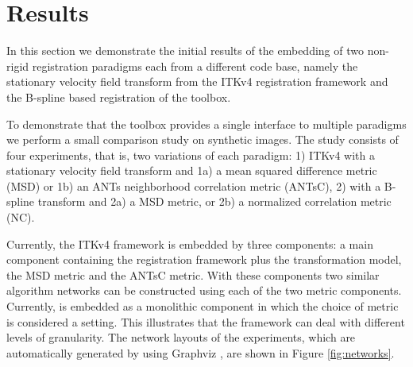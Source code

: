 \section{Results}
\label{sec:results}

In this section we demonstrate the initial results of the embedding
of two non-rigid registration paradigms each from a different code
base, namely the stationary velocity field transform from the ITKv4
registration framework and the B-spline based registration of the
\elastix{} toolbox.

To demonstrate that the toolbox provides a single interface to 
multiple paradigms we perform a small comparison study on synthetic 
images. The study consists of four experiments, that is, two variations 
of each paradigm: 1) ITKv4 with a stationary velocity field 
transform and 1a) a mean squared difference metric (MSD) or 1b) an ANTs 
neighborhood correlation metric (ANTsC), 2) \elastix{} with a B-spline 
transform and 2a) a MSD metric, or 2b) a 
normalized correlation metric (NC).

Currently, the ITKv4 framework is embedded by three components: a
main component containing the registration framework plus the
transformation model, the MSD metric and the
ANTsC metric. With these components two
similar algorithm networks can be constructed using each of the two
metric components. Currently, \elastix{} is embedded as a monolithic
component in which the choice of metric is considered a setting. This 
illustrates that the framework can deal with different levels of granularity.
The network layouts of the experiments, which are automatically generated by \SuperElastix{} using Graphviz \cite{Gansner:graphviz}, are shown in Figure
\ref{fig:networks}.

